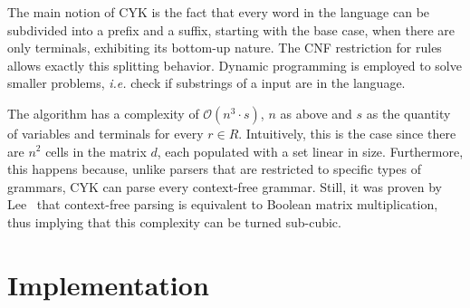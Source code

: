 \documentclass[12pt]{article}
\begin{document}
The main notion of CYK is the fact that every word in the language can be subdivided into a prefix and a suffix, starting with the base case, when there are only terminals, exhibiting its bottom-up nature. The CNF restriction for rules allows exactly this splitting behavior. Dynamic programming is employed to solve smaller problems, \emph{i.e.} check if substrings of a input are in the language.

The algorithm has a complexity of $\mathcal{O}(n^{3} \cdot s)$, $n$ as above and $s$ as the quantity of variables and terminals for every $r \in R$. Intuitively, this is the case since there are $n^{2}$ cells in the matrix $d$, each populated with a set linear in size. Furthermore, this happens because, unlike parsers that are restricted to specific types of grammars, CYK can parse every context-free grammar. Still, it was proven by Lee~\cite{} that context-free parsing is equivalent to Boolean matrix multiplication, thus implying that this complexity can be turned sub-cubic.

\section{Implementation}\label{sec:imp}



\end{document}
